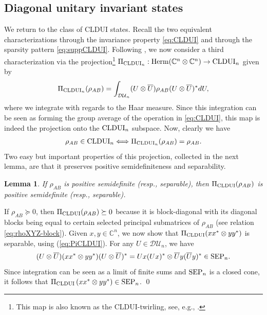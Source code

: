 \documentclass[11pt]{article}
\makeatletter
\newcommand{\C}{\ensuremath{\mathbb{C}}} %
\newcommand{\MDU}{{\mathcal {DU}}}
\newcommand{\Herm}{\mathrm{Herm}}
\newcommand{\SEP}{\text{\rm SEP}}
\newcommand{\CLDUI}{\text{\rm CLDUI}}
\newcommand{\ot}{\otimes}
\theoremstyle{plain}
\newtheorem{lemma}[satz]{Lemma}
\renewenvironment{proof}[1][\proofname]{%
  \par
  \pushQED{}%
  \normalfont
  \topsep6\p@\@plus6\p@
  \trivlist
  \item[\hskip\labelsep\itshape #1\@addpunct{.}]%
}{%
  \popQED
  \endtrivlist
}
\makeatother
\begin{document}
  
  
\subsection{Diagonal unitary invariant states}\label{sec:CLDUI}

We   return to the class of CLDUI states. Recall the two equivalent characterizations through the invariance property  \eqref{eq:CLDUI} and through the sparsity pattern   \eqref{eq:suppCLDUI}. Following \cite{JML-PCP}, we now consider a third characterization via the projection\footnote{This map is also known as the CLDUI-twirling, see, e.g., \cite{GNP_2025}.}
 $\Pi_{\CLDUI_n}: \Herm(\C^n\ot\C^n)\to\CLDUI_n$ given by 
\begin{align}\label{eq:PiCLDUI}
    \Pi_{\CLDUI_n}(\rho_{AB})=\int_{\MDU_n}(U\ot\overline{U})\rho_{AB}(U\ot\overline{U})^*dU,
\end{align}
where we integrate with regards to the Haar measure. Since this integration can be seen as forming the group average of the operation in \eqref{eq:CLDUI}, this map is indeed the projection onto the $\CLDUI_n$ subspace. Now, clearly we have
\begin{align*}
    \rho_{AB}\in\CLDUI_n\Longleftrightarrow\Pi_{\CLDUI_n}(\rho_{AB})=\rho_{AB}.
\end{align*}
Two easy but important properties of this projection, collected in the next lemma, are that  it preserves positive semidefiniteness and separability.

\begin{lemma}\label{lem:projection-psd-sep}
If $\rho_{AB}$ is positive semidefinite (resp., separable), then $\Pi_{\CLDUI}(\rho_{AB})$ is positive semidefinite (resp., separable).
\end{lemma}

\begin{proof}
 If $\rho_{AB}\succeq 0$, then $\Pi_{\CLDUI}(\rho_{AB})\succeq 0$ because 
it  is block-diagonal with its diagonal blocks being equal to certain selected principal submatrices of $\rho_{AB}$ 
 (see relation \eqref{eq:rhoXYZ-block}). 
Given $x,y\in\C^n$, we now show that  $\Pi_{\CLDUI}(xx^*\ot yy^*)$ is separable, using  (\ref{eq:PiCLDUI}).
 For any $U\in \MDU_n$, we have  
 $$(U\ot\overline{U}) (xx^*\ot yy^*) (U\ot\overline{U})^*=Ux(Ux)^*\ot\overline{U}y(\overline{U}y)^*\in\SEP_n.$$ 
Since integration can be seen as a limit of finite sums and  $\SEP_n$ is a closed cone, it follows that $\Pi_{\CLDUI}\left(xx^*\otimes yy^*\right) \in \SEP_n$.
\qed\end{proof}
\end{document}
